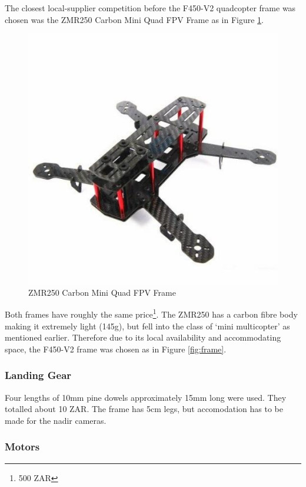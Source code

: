 The closest local-supplier competition before the F450-V2 quadcopter frame was chosen was the ZMR250 Carbon Mini Quad FPV Frame as in Figure \ref{fig:zmr}.

\begin{figure}[H]
\centering
\includegraphics[scale=0.35]{images/zmr250.jpeg}
\caption{ZMR250 Carbon Mini Quad FPV Frame \cite{frobot}}
\label{fig:zmr}
\end{figure}

Both frames have roughly the same price\footnote{500 ZAR}. The ZMR250 has a carbon fibre body making it extremely light (145g), but fell into the class of `mini multicopter' as mentioned earlier. Therefore due to its local availability and accommodating space, the F450-V2 frame was chosen as in Figure \ref{fig:frame}.

\subsubsection{Landing Gear}

Four lengths of 10mm pine dowels approximately 15mm long were used. They totalled about 10 ZAR. The frame has 5cm legs, but accomodation has to be made for the nadir cameras.

\subsubsection{Motors}

